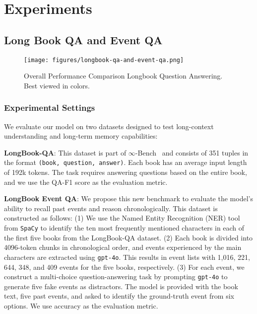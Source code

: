 \vspace{-10pt}
\section{Experiments}
\vspace{-5pt}

\subsection{Long Book QA and Event QA}
\label{sub:long_book_and_event_qa}

\begin{figure}
    \centering
    \texttt{[image: figures/longbook-qa-and-event-qa.png]}
    \vspace{-20pt}
    \caption{Overall Performance Comparison Longbook Question Answering. Best viewed in colors.}
    \label{fig:longbook-qa}
    \vspace{-10pt}
\end{figure}

\vspace{-5pt}
\subsubsection{Experimental Settings}
\vspace{-5pt}
We evaluate our model on two datasets designed to test long-context understanding and long-term memory capabilities:

\textbf{LongBook-QA}: This dataset is part of $\infty$-Bench~\citep{infinitebench} and consists of 351 tuples in the format \texttt{(book, question, answer)}. Each book has an average input length of 192k tokens. The task requires answering questions based on the entire book, and we use the QA-F1 score as the evaluation metric.

\textbf{LongBook Event QA}: We propose this new benchmark to evaluate the model’s ability to recall past events and reason chronologically. This dataset is constructed as follows:
(1) We use the Named Entity Recognition (NER) tool from \texttt{SpaCy} to identify the ten most frequently mentioned characters in each of the first five books from the LongBook-QA dataset.
(2) Each book is divided into 4096-token chunks in chronological order, and events experienced by the main characters are extracted using \texttt{gpt-4o}. This results in event lists with 1,016, 221, 644, 348, and 409 events for the five books, respectively.
(3) For each event, we construct a multi-choice question-answering task by prompting \texttt{gpt-4o} to generate five fake events as distractors. The model is provided with the book text, five past events, and asked to identify the ground-truth event from six options. We use accuracy as the evaluation metric. 

